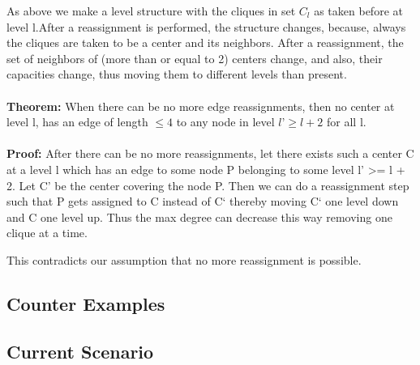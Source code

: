 \documentclass[12pt,a4paper,onecolumn]{article}
\begin{document}
\begin{itemize}
\begin{figure}
\end{figure}
As above we make a level structure with the cliques in set $C_l$ as taken before at level l.After a reassignment is performed, the structure changes, because, always the cliques are taken to be a center and its neighbors. After a reassignment, the set of neighbors of (more than or equal to 2) centers change, and also, their capacities change, thus moving them to different levels than present. \\\\\textbf{Theorem:}
When there can be no more edge reassignments, then no center at level l, has an edge of length $\leq 4$ to any node in level $l’ \geq l+2$ for all l. 
\\\\
\textbf{Proof:}
After there can be no more reassignments, let there exists such a center C at a level l which has an edge to some node P belonging to some level l’ >= l + 2. Let C’ be the center covering the node P. Then we can do a reassignment step such that P gets assigned to C instead of C` thereby moving C` one level down and C one level up. Thus the max degree can decrease this way removing one clique at a time. 


\begin{figure}

\end{figure}

This contradicts our assumption that no more reassignment is possible.

\end{itemize}
\subsection{Counter Examples}
\subsection{Current Scenario}
\end{document}
